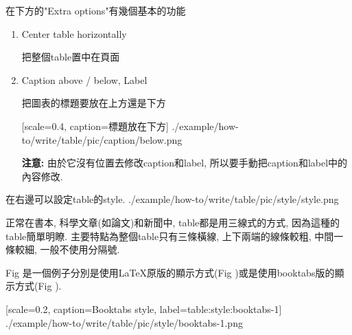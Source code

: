 \newpage
{}

  在下方的"Extra options"有幾個基本的功能

\begin{enumerate}

  \item
  {
  Center table horizontally

  把整個table置中在頁面

  } %

  \label{chapter:how-to:write:table:label-example}
  \item
  {
  Caption above / below, Label

  把圖表的標題要放在上方還是下方

    {
      [scale=0.4,
      caption={標題放在下方}]
      {./example/how-to/write/table/pic/caption/below.png}
    }

  {\bf 注意:} 由於它沒有位置去修改caption和label, 所以要手動把caption和label中的內容修改.
  } %
\end{enumerate}

\newpage
{}

  在右邊可以設定table的style.
  \InsertFigure
    {./example/how-to/write/table/pic/style/style.png}

   正常在書本, 科學文章(如論文)和新聞中, table都是用三線式的方式, 因為這種的table簡單明瞭. 主要特點為整個table只有三條橫線, 上下兩端的線條較粗, 中間一條較細, 一般不使用分隔號.

  Fig 是一個例子分別是使用LaTeX原版的顯示方式(Fig )或是使用booktabs版的顯示方式(Fig ).

    {
      [scale=0.2,
      caption={Booktabs style},
      label={table:style:booktabs-1}]
      {./example/how-to/write/table/pic/style/booktabs-1.png}
    }

